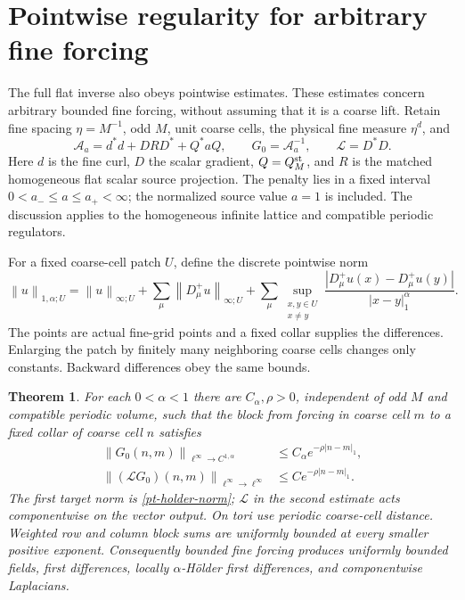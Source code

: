 \documentclass[11pt]{article}
\newtheorem{theorem}{Theorem}[section]
\newcommand{\norm}[1]{\left\lVert#1\right\rVert}
\begin{document}
\section{Pointwise regularity for arbitrary fine forcing}
\label{pt-section}

The full flat inverse also obeys pointwise estimates. These estimates
concern arbitrary bounded fine forcing, without assuming that it is a
coarse lift. Retain fine spacing $\eta=M^{-1}$, odd $M$, unit coarse
cells, the physical fine measure $\eta^d$, and
\begin{equation}\label{pt-operator}
 \mathcal A_a=d^*d+DRD^*+Q^*aQ,\qquad G_0=\mathcal A_a^{-1},
 \qquad \mathcal L=D^*D.
\end{equation}
Here $d$ is the fine curl, $D$ the scalar gradient, $Q=Q_M^{\rm st}$,
and $R$ is the matched homogeneous flat scalar source projection.
The penalty lies in a fixed interval $0<a_-\le a\le a_+<\infty$;
the normalized source value $a=1$ is included. The discussion applies
to the homogeneous infinite lattice and compatible periodic regulators.

For a fixed coarse-cell patch $U$, define the discrete pointwise norm
\begin{equation}\label{pt-holder-norm}
 \norm{u}_{1,\alpha;U}=\norm{u}_{\infty;U}
  +\sum_\mu\norm{D_\mu^+u}_{\infty;U}
  +\sum_\mu\sup_{\substack{x,y\in U\\x\ne y}}
       \frac{|D_\mu^+u(x)-D_\mu^+u(y)|}{|x-y|_1^\alpha}.
\end{equation}
The points are actual fine-grid points and a fixed collar supplies the
differences. Enlarging the patch by finitely many neighboring coarse
cells changes only constants. Backward differences obey the same bounds.

\begin{theorem}\label{pt-theorem}
For each $0<\alpha<1$ there are $C_\alpha,\rho>0$, independent of
odd $M$ and compatible periodic volume, such that the block from
forcing in coarse cell $m$ to a fixed collar of coarse cell $n$ satisfies
\begin{align}
 \norm{G_0(n,m)}_{\ell^\infty\to C^{1,\alpha}}
       &\le C_\alpha e^{-\rho|n-m|_1},
       \label{pt-pointwise-bound}\\
 \norm{(\mathcal L G_0)(n,m)}_{\ell^\infty\to\ell^\infty}
       &\le C e^{-\rho|n-m|_1}.
       \label{pt-laplacian-bound}
\end{align}
The first target norm is \eqref{pt-holder-norm}; $\mathcal L$ in
the second estimate acts componentwise on the vector output.
On tori use periodic coarse-cell distance. Weighted row and column
block sums are uniformly bounded at every smaller positive exponent.
Consequently bounded fine forcing produces uniformly bounded fields,
first differences, locally $\alpha$-H\"older first differences, and
componentwise Laplacians.
\end{theorem}
\end{document}
